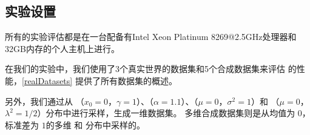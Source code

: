 \subsection{实验设置}
\begin{table}[t]
    \centering
    \caption{数据集信息汇总}
    \label{realDatasets}
\end{table}

所有的实验评估都是在一台配备有Intel Xeon Platinum 8269@2.5GHz处理器和32GB内存的个人主机上进行。

在我们的实验中，我们使用了3个真实世界的数据集和5个合成数据集来评估 \myahead 的性能，\autoref{realDatasets} 提供了所有数据集的概述。

另外，我们通过从 \Cauchy（$x_0=0$，$\gamma=1$）、\Zipf（$\alpha=1.1$）、\Gaussian（$\mu=0$，$\sigma^2=1$）和 \Laplacian（$\mu=0$，$\lambda^2=1/2$）分布中进行采样，生成一维数据集\cite{ye2019privkv, cormode2019answering, yang2020answering}。
多维合成数据集则是从均值为 $0$，标准差为 $1$的多维 \Gaussian 和 \Laplacian 分布中采样的\cite{yang2020answering}。

